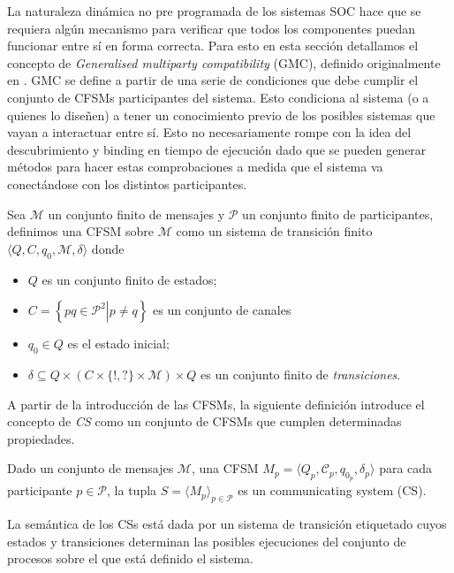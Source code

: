 La naturaleza dinámica no pre programada de los sistemas SOC hace que se requiera algún mecanismo para verificar que todos los componentes puedan funcionar entre sí en forma correcta. Para esto en esta sección detallamos el concepto de \emph{Generalised multiparty compatibility} (GMC), definido originalmente en \cite{lange:popl15}. GMC se define a partir de una serie de condiciones que debe cumplir el conjunto de CFSMs participantes del sistema. Esto condiciona al sistema (o a quienes lo diseñen) a tener un conocimiento previo de los posibles sistemas que vayan a interactuar entre sí. Esto no necesariamente rompe con la idea del descubrimiento y binding en tiempo de ejecución dado que se pueden generar métodos para hacer estas comprobaciones a medida que el sistema va conectándose con los distintos participantes. %

\begin{definition} Sea $\mathcal{M}$ un conjunto finito de mensajes y $\mathcal{P}$ un conjunto finito de participantes, definimos una CFSM sobre $\mathcal{M}$ como un sistema de transición finito $\langle Q, C, q_0, \mathcal{M}, \delta \rangle$ donde
\begin{itemize}
  \item $Q$ es un conjunto finito de estados;
  \item $C = \left\{ pq \in \mathcal{P}^2 \left|\right. p \not= q\right\}$ es un conjunto de canales
  \item $q_0 \in Q$ es el estado inicial;
  \item $\delta \subseteq Q \times (C \times \{!,?\} \times \mathcal{M}) \times Q$ es un conjunto finito de \emph{transiciones}.
  \end{itemize}
\end{definition} 

A partir de la introducción de las CFSMs, la siguiente definición introduce el concepto de \emph{CS} como un conjunto de CFSMs que cumplen determinadas propiedades.

\begin{definition}\label{def:CS} Dado un conjunto de mensajes $\mathcal{M}$, una CFSM $\textit{M}_p = \langle Q_p, \mathcal{C}_p, q_{0_p}, \delta_p \rangle$ para cada participante $p \in \mathcal{P}$, la tupla $S=\langle M_p \rangle_{p \in \mathcal{P}}$ es un communicating system (CS).
\end{definition}

La semántica de los CSs está dada por un sistema de transición etiquetado cuyos estados y transiciones determinan las posibles ejecuciones del conjunto de procesos sobre el que está definido el sistema.

